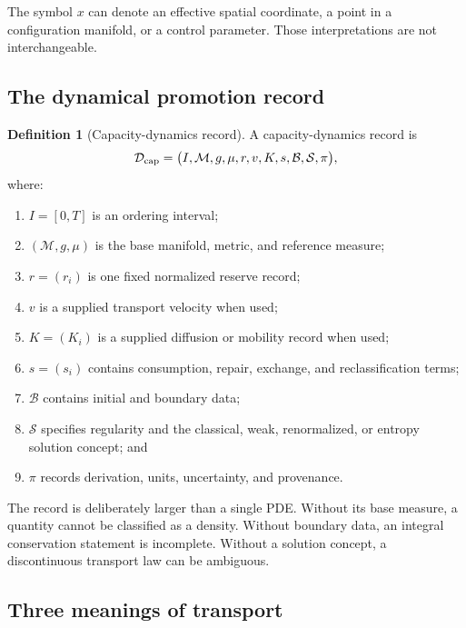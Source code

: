 \documentclass[11pt]{article}
\theoremstyle{definition}
\newtheorem{definition}[theorem]{Definition}
\theoremstyle{remark}
\newcommand{\cB}{\mathcal B}
\newcommand{\cD}{\mathcal D}
\newcommand{\cM}{\mathcal M}
\newcommand{\cS}{\mathcal S}
\begin{document}
The symbol \(x\) can denote an effective spatial coordinate, a point in a
configuration manifold, or a control parameter.  Those interpretations
are not interchangeable.

\subsection{The dynamical promotion record}

\begin{definition}[Capacity-dynamics record]
\label{def:record}
A capacity-dynamics record is
\[
 \cD_{\rm cap}
 =
 \bigl(
 I,\cM,g,\mu,r,v,K,s,\cB,\cS,\pi
 \bigr),
\]
where:
\begin{enumerate}[leftmargin=2.2em]
\item \(I=[0,T]\) is an ordering interval;
\item \((\cM,g,\mu)\) is the base manifold, metric, and reference measure;
\item \(r=(r_i)\) is one fixed normalized reserve record;
\item \(v\) is a supplied transport velocity when used;
\item \(K=(K_i)\) is a supplied diffusion or mobility record when used;
\item \(s=(s_i)\) contains consumption, repair, exchange, and
      reclassification terms;
\item \(\cB\) contains initial and boundary data;
\item \(\cS\) specifies regularity and the classical, weak, renormalized,
      or entropy solution concept; and
\item \(\pi\) records derivation, units, uncertainty, and provenance.
\end{enumerate}
\end{definition}

The record is deliberately larger than a single PDE.  Without its base
measure, a quantity cannot be classified as a density.  Without boundary
data, an integral conservation statement is incomplete.  Without a
solution concept, a discontinuous transport law can be ambiguous.

\subsection{Three meanings of transport}
\end{document}
